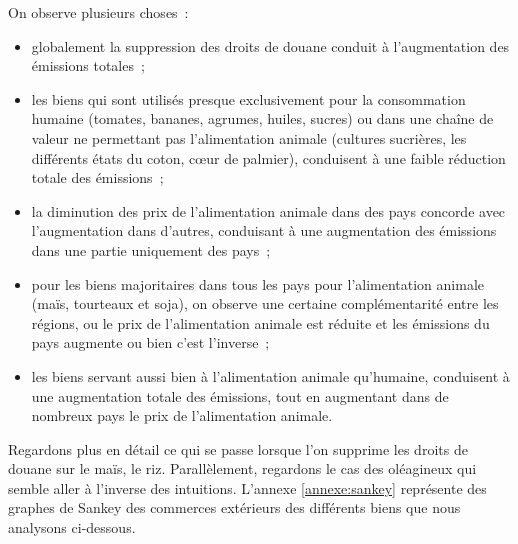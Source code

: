 On observe plusieurs choses~:
\begin{itemize}
    \item globalement la suppression des droits de douane conduit à l'augmentation des émissions totales~;
    \item les biens qui sont utilisés presque exclusivement pour la consommation humaine (tomates, bananes, agrumes, huiles, sucres) ou dans une chaîne de valeur ne permettant pas l'alimentation animale (cultures sucrières, les différents états du coton, cœur de palmier), conduisent à une faible réduction totale des émissions~;
    \item la diminution des prix de l'alimentation animale dans des pays concorde avec l'augmentation dans d'autres, conduisant à une augmentation des émissions dans une partie uniquement des pays~;
    \item pour les biens majoritaires dans tous les pays pour l'alimentation animale (maïs, tourteaux et soja), on observe une certaine complémentarité entre les régions, ou le prix de l'alimentation animale est réduite et les émissions du pays augmente ou bien c'est l'inverse~;
    \item les biens servant aussi bien à l'alimentation animale qu'humaine, conduisent à une augmentation totale des émissions, tout en augmentant dans de nombreux pays le prix de l'alimentation animale.
\end{itemize}

Regardons plus en détail ce qui se passe lorsque l'on supprime les droits de douane sur le maïs, le riz. Parallèlement, regardons le cas des oléagineux qui semble aller à l'inverse des intuitions. L'annexe \ref{annexe:sankey} représente des graphes de Sankey des commerces extérieurs des différents biens que nous analysons ci-dessous.

